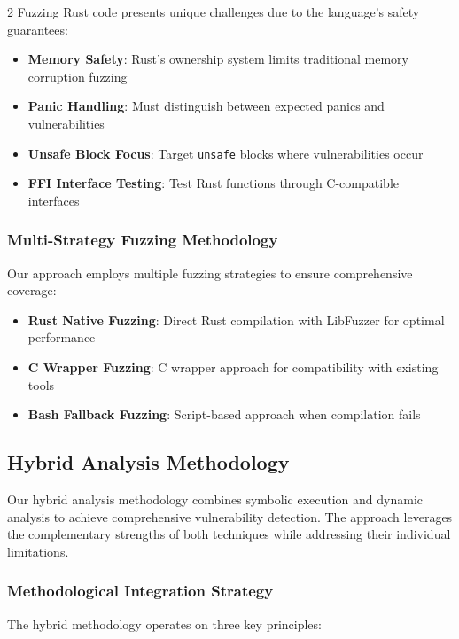 \documentclass[12pt,a4paper]{article}
\begin{document}
\begin{multicols}{2}
Fuzzing Rust code presents unique challenges due to the language's safety guarantees:

\begin{itemize}
    \item \textbf{Memory Safety}: Rust's ownership system limits traditional memory corruption fuzzing
    \item \textbf{Panic Handling}: Must distinguish between expected panics and vulnerabilities
    \item \textbf{Unsafe Block Focus}: Target \texttt{unsafe} blocks where vulnerabilities occur
    \item \textbf{FFI Interface Testing}: Test Rust functions through C-compatible interfaces
\end{itemize}

\subsubsection{Multi-Strategy Fuzzing Methodology}

Our approach employs multiple fuzzing strategies to ensure comprehensive coverage:

\begin{itemize}
    \item \textbf{Rust Native Fuzzing}: Direct Rust compilation with LibFuzzer for optimal performance
    \item \textbf{C Wrapper Fuzzing}: C wrapper approach for compatibility with existing tools
    \item \textbf{Bash Fallback Fuzzing}: Script-based approach when compilation fails
\end{itemize}

\subsection{Hybrid Analysis Methodology}

Our hybrid analysis methodology combines symbolic execution and dynamic analysis to achieve comprehensive vulnerability detection. The approach leverages the complementary strengths of both techniques while addressing their individual limitations.

\subsubsection{Methodological Integration Strategy}

The hybrid methodology operates on three key principles:


\end{multicols}
\end{document}
